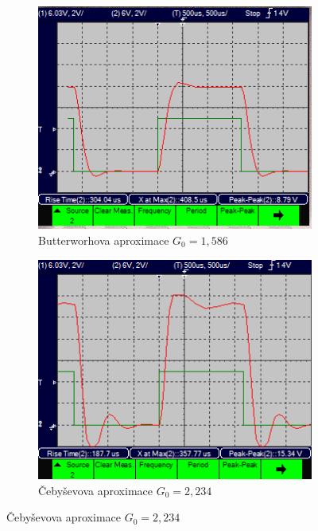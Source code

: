 \documentclass[twoside]{article}
\begin{document}
\begin{figure}[h!]
    \begin{subfigure}{0.48\textwidth}
        \centering
        \includegraphics[width=1\linewidth]{step_butter.png}
        \caption{Butterworhova aproximace $G_0 = 1,586$}
        \label{fig:step_butter}
    \end{subfigure}
    \begin{subfigure}{0.48\textwidth}
        \centering
        \includegraphics[width=1\linewidth]{step_cebysev.png}
        \caption{Čebyševova aproximace $G_0 = 2,234$}
        \label{fig:step_cebysev}
    \end{subfigure}


\end{figure}
\end{document}
